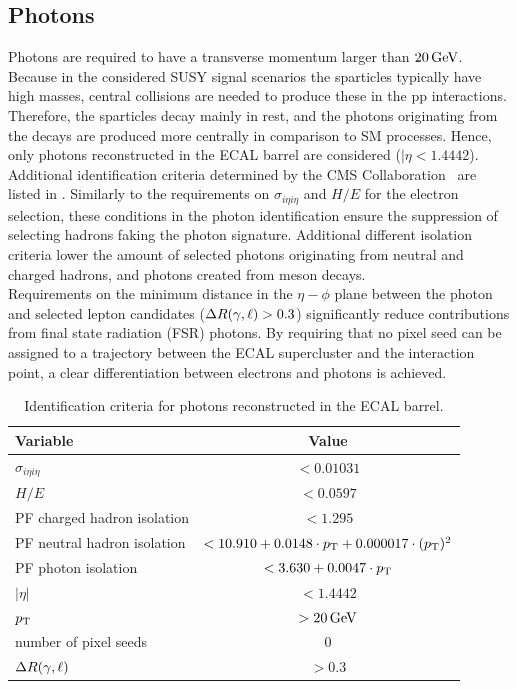 \subsection{Photons}
Photons are required to have a transverse momentum larger than $20\,\text{Ge\hspace{-.08em}V}$. Because in the considered SUSY signal scenarios the sparticles typically have high masses, central collisions are needed to produce these in the pp interactions. Therefore, the sparticles decay mainly in rest, and the photons originating from the decays are produced more centrally in comparison to SM processes. Hence, only photons reconstructed in the ECAL barrel are considered ($|\eta<1.4442$). Additional identification criteria determined by the CMS Collaboration~\cite{photonID} are listed in .
Similarly to the requirements on $\sigma_{i\eta i\eta}$ and $H/E$ for the electron selection, these conditions in the photon identification ensure the suppression of selecting hadrons faking the photon signature. Additional different isolation criteria lower the amount of selected photons originating from neutral and charged hadrons, and photons created from meson decays.\\
Requirements on the minimum distance in the $\eta-\phi$ plane between the photon and selected lepton candidates ($\Delta R(\gamma,\ell)>0.3$) significantly reduce contributions from final state radiation (FSR) photons. By requiring that no pixel seed can be assigned to a trajectory between the ECAL supercluster and the interaction point, a clear differentiation between electrons and photons is achieved.
\begin{table}[b]
 \centering
 \caption{Identification criteria for photons reconstructed in the ECAL barrel.}
 \label{tab:photonID}
 \begin{tabular}{lc}
  Variable                    & Value                                                \\\hline
  $\sigma_{i\eta i\eta}$      & $<0.01031$                                           \\
  $H/E$                       & $<0.0597$                                            \\
  PF charged hadron isolation & $<1.295$                                             \\
  PF neutral hadron isolation & $<10.910 + 0.0148 \cdot p_{\mathrm{T}} + 0.000017\cdot (p_{\mathrm{T}})^2$ \\
  PF photon isolation         & $<3.630+0.0047\cdot p_{\mathrm{T}}$                             \\\hline
  $|\eta|$                    & $<1.4442$                                            \\
  $p_{\mathrm{T}}$                       & $>20\,\text{Ge\hspace{-.08em}V}$                                            \\
  number of pixel seeds       & $0$                                                  \\
  $\Delta R (\gamma,\ell)$      & $>0.3$                                               \\\hline
 \end{tabular}
 \vspace{\baselineskip}
\end{table}

